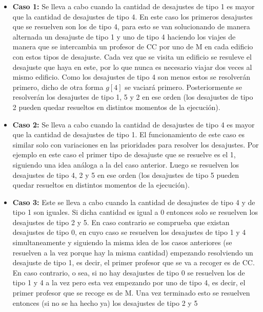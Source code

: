 \documentclass[11pt]{article}
\begin{document}
    \begin{itemize}
        \item \textbf{Caso 1:} Se lleva a cabo cuando la cantidad de desajustes de tipo 1 es mayor que la
              cantidad de desajustes de tipo 4. En este caso los primeros desajustes que se resuelven son los
              de tipo 4, para esto se van solucionando de manera alternada un desajuste de tipo 1 y uno de tipo 4
              haciendo los viajes de manera que se intercambia un profesor de CC por uno de M en cada edificio con
              estos tipos de desajuste. Cada vez que se visita un edificio se resuleve el desajuste que haya en este,
              por lo que nunca es necesario viajar dos veces al mismo edificio. Como los desajustes de tipo 4 son menos 
              estos se resolverán primero, dicho de otra forma $g[4]$ se vaciará primero. Posteriormente se resolverán 
              los desajustes de tipo 1, 5 y 2 en ese orden (los desajustes de tipo 2 pueden quedar resueltos en distintos 
              momentos de la ejecución).
        \item \textbf{Caso 2:} Se lleva a cabo cuando la cantidad de desajustes de tipo 4 es mayor que la
              cantidad de desajustes de tipo 1. El funcionamiento de este caso es similar solo con variaciones en
              las prioridades para resolver los desajustes. Por ejemplo en este caso el primer tipo de desajuste que se
              resuelve es el 1, siguiendo una idea análoga a la del caso anterior. Luego se resuelven los
              desajustes de tipo 4, 2 y 5 en ese orden (los desajustes de tipo 5 pueden quedar resueltos en distintos momentos 
              de la ejecución).
        \item \textbf{Caso 3:} Este se lleva a cabo cuando la cantidad de desajustes de tipo 4 y de tipo 1 son iguales.
              Si dicha cantidad es igual a 0 entonces solo se resuelven los desajustes de tipo 2 y 5. En caso contrario
              se comprueba que existan desajustes de tipo 0, en cuyo caso se resuelven los desajustes de tipo 1 y 4
              simultaneamente y siguiendo la misma idea de los casos anteriores (se resuelven a la vez porque hay la misma
              cantidad) empezando resolviendo un desajuste de tipo 1, es decir, el primer profesor que se va a recoger
              es de CC. En caso contrario, o sea, si no hay desajustes de tipo 0 se resuelven los de tipo 1 y 4 a la vez
              pero esta vez empezando por uno de tipo 4, es decir, el primer profesor que se recoge es de M. Una vez
              terminado esto se resuelven entonces (si no se ha hecho ya) los desajustes de tipo 2 y 5
    \end{itemize}
\end{document}
